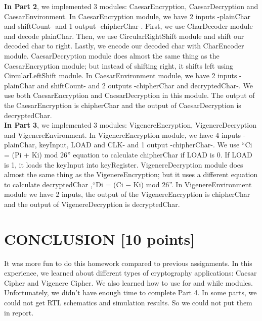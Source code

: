 \documentclass[pdftex,12pt,a4paper]{article}
\begin{document}
\textbf{In Part 2}, we implemented 3 modules: CaesarEncryption, CaesarDecryption and CaesarEnvironment. In CaesarEncryption module, we have 2 inputs -plainChar and shiftCount- and 1 output -chipherChar-. First, we use CharDecoder module and decode plainChar. Then, we use CircularRightShift module and shift our decoded char to right. Lastly, we encode our decoded char with CharEncoder module. CaesarDecryption module does almost the same thing as the CaesarEncryption module; but instead of shifting right, it shifts left using CircularLeftShift module. In CaesarEnvironment module, we have 2 inputs -plainChar and shiftCount- and 2 outputs -chipherChar and decryptedChar-. We use both CaesarEncryption and CaesarDecryption in this module. The output of the CaesarEncryption is chipherChar and the output of CaesarDecryption is decryptedChar.\\


\textbf{In Part 3}, we implemented 3 modules: VigenereEncryption, VigenereDecryption and VigenereEnvironment. In VigenereEncryption module, we have 4 inputs -plainChar, keyInput, LOAD and CLK- and 1 output -chipherChar-. We use “Ci = (Pi + Ki) mod 26”  equation to calculate chipherChar if LOAD is 0. If LOAD is 1, it loads the keyInput into keyRegister. VigenereDecryption module does almost the same thing as the VigenereEncryption; but it uses a different equation to calculate decryptedChar ,“Di = (Ci − Ki) mod 26”. In VigenereEnvironment module we have 2 inputs, the output of the VigenereEncryption is chipherChar and the output of VigenereDecryption is decryptedChar.




\section{CONCLUSION [10 points]}
It was more fun to do this homework compared to previous assignments. In this experience, we learned about different types of cryptography applications: Caesar Cipher and Vigenere Cipher. We also learned how to use for and while modules. Unfortunately, we didn’t have enough time to complete Part 4. In some parts, we could not get RTL schematics and simulation results. So we could not put them in report.
\end{document}
